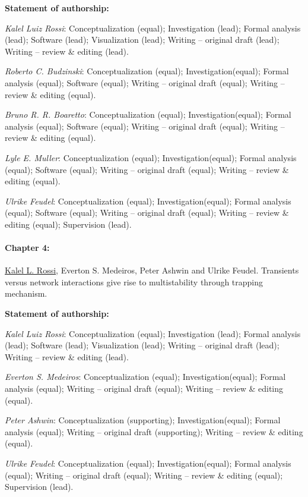 {\vspace{0.3cm}\footnotesize \textbf{Statement of authorship:} %

\textit{Kalel Luiz Rossi}: Conceptualization (equal); Investigation (lead); Formal analysis (lead); Software (lead); Visualization (lead); Writing – original draft (lead); Writing – review \& editing (lead). 

\textit{Roberto C. Budzinski}: Conceptualization (equal); Investigation(equal); Formal analysis (equal); Software (equal); Writing – original draft (equal); Writing – review \& editing (equal).

\textit{Bruno R. R. Boaretto}: Conceptualization (equal); Investigation(equal); Formal analysis (equal); Software (equal); Writing – original draft (equal); Writing – review \& editing (equal).

\textit{Lyle E. Muller}: Conceptualization (equal); Investigation(equal); Formal analysis (equal); Software (equal); Writing – original draft (equal); Writing – review \& editing (equal).

\textit{Ulrike Feudel}: Conceptualization (equal); Investigation(equal); Formal analysis (equal); Software (equal); Writing – original draft (equal); Writing – review \& editing (equal); Supervision (lead).
}

\paragraph{Chapter 4:}
\underline{Kalel L. Rossi}, Everton S. Medeiros, Peter Ashwin and Ulrike Feudel. Transients versus network interactions give rise to multistability through trapping mechanism.

{\vspace{0.3cm}\footnotesize \textbf{Statement of authorship:} %

\textit{Kalel Luiz Rossi}: Conceptualization (equal); Investigation (lead); Formal analysis (lead); Software (lead); Visualization (lead); Writing – original draft (lead); Writing – review \& editing (lead). 

\textit{Everton S. Medeiros}: Conceptualization (equal); Investigation(equal); Formal analysis (equal); Writing – original draft (equal); Writing – review \& editing (equal).

\textit{Peter Ashwin}: Conceptualization (supporting); Investigation(equal); Formal analysis (equal); Writing – original draft (supporting); Writing – review \& editing (equal).

\textit{Ulrike Feudel}: Conceptualization (equal); Investigation(equal); Formal analysis (equal); Writing – original draft (equal); Writing – review \& editing (equal); Supervision (lead).
}

